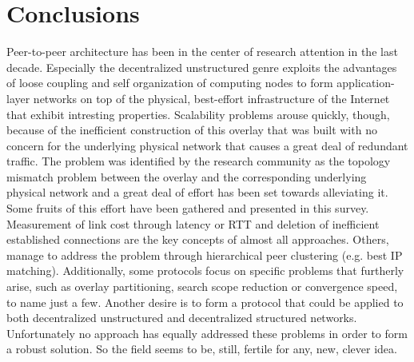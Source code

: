 \documentclass[a4paper,10pt]{article}
\begin{document}
\section{Conclusions}
Peer-to-peer architecture has been in the center of research attention in the last decade. Especially the decentralized unstructured genre exploits the advantages of loose coupling and self organization of computing nodes to form application-layer networks on top of the physical, best-effort infrastructure of the Internet that exhibit intresting properties. Scalability problems arouse quickly, though, because of the inefficient construction of this overlay that was built with no concern for the underlying physical network that causes a great deal of redundant traffic. The problem was identified by the research community as the topology mismatch problem between the overlay and the corresponding underlying physical network and a great deal of effort has been set towards alleviating it. Some fruits of this effort have been gathered and presented in this survey. Measurement of link cost through latency or RTT and deletion of inefficient established connections are the key concepts of almost all approaches. Others, manage to address the problem through hierarchical peer clustering (e.g. best IP matching). Additionally, some protocols focus on specific problems that furtherly arise, such as overlay partitioning, search scope reduction or convergence speed, to name just a few. Another desire is to form a protocol that could be applied to both decentralized unstructured and decentralized structured networks. Unfortunately no approach has equally addressed these problems in order to form a robust solution. So the field seems to be, still, fertile for any, new, clever idea.



\end{document}

